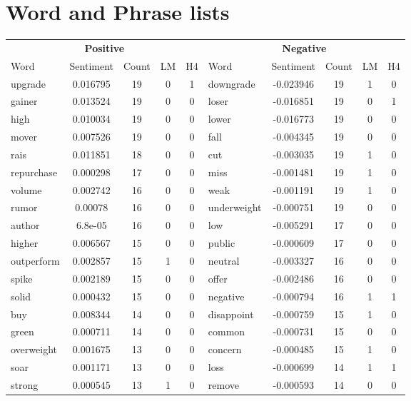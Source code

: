 \documentclass[ oneside,tikz,%
                    author={Joshua Felmeden},
                    degree={MEng},
                     title={Semantic Analysis of Financial Headlines Based on Realised Stock Returns},
                  subtitle={Research}]{dissertation}
\begin{document}
\chapter{Word and Phrase lists}
\begin{table}
      
\begin{tabular}{lcccclcccc}
\multicolumn{5}{c}{\textbf{Positive}} & \multicolumn{5}{c}{\textbf{Negative}} \\
\cmidrule(lr){1-5}
\cmidrule(lr){6-10}
Word & Sentiment & Count & LM & H4 & Word & Sentiment & Count & LM & H4 \\
\cmidrule(lr){1-5}
\cmidrule(lr){6-10}
upgrade & 0.016795 & 19 & 0 & 1 & downgrade & -0.023946 & 19 & 1 & 0 \\
gainer & 0.013524 & 19 & 0 & 0 & loser & -0.016851 & 19 & 0 & 1 \\
high & 0.010034 & 19 & 0 & 0 & lower & -0.016773 & 19 & 0 & 0 \\
mover & 0.007526 & 19 & 0 & 0 & fall & -0.004345 & 19 & 0 & 0 \\
rais & 0.011851 & 18 & 0 & 0 & cut & -0.003035 & 19 & 1 & 0 \\
repurchase & 0.000298 & 17 & 0 & 0 & miss & -0.001481 & 19 & 1 & 0 \\
volume & 0.002742 & 16 & 0 & 0 & weak & -0.001191 & 19 & 1 & 0 \\
rumor & 0.00078 & 16 & 0 & 0 & underweight & -0.000751 & 19 & 0 & 0 \\
author & 6.8e-05 & 16 & 0 & 0 & low & -0.005291 & 17 & 0 & 0 \\
higher & 0.006567 & 15 & 0 & 0 & public & -0.000609 & 17 & 0 & 0 \\
outperform & 0.002857 & 15 & 1 & 0 & neutral & -0.003327 & 16 & 0 & 0 \\
spike & 0.002189 & 15 & 0 & 0 & offer & -0.002486 & 16 & 0 & 0 \\
solid & 0.000432 & 15 & 0 & 0 & negative & -0.000794 & 16 & 1 & 1 \\
buy & 0.008344 & 14 & 0 & 0 & disappoint & -0.000759 & 15 & 1 & 0 \\
green & 0.000711 & 14 & 0 & 0 & common & -0.000731 & 15 & 0 & 0 \\
overweight & 0.001675 & 13 & 0 & 0 & concern & -0.000485 & 15 & 1 & 0 \\
soar & 0.001171 & 13 & 0 & 0 & loss & -0.000699 & 14 & 1 & 1 \\
strong & 0.000545 & 13 & 1 & 0 & remove & -0.000593 & 14 & 0 & 0 \\

\end{tabular}
\end{table}
\end{document}
